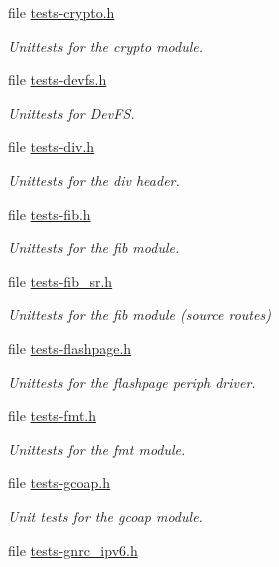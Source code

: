 \begin{DoxyCompactItemize}
file \hyperlink{tests-crypto_8h}{tests-\/crypto.\+h}
\begin{DoxyCompactList}\small\item\em Unittests for the {\ttfamily crypto} module. \end{DoxyCompactList}\item 
file \hyperlink{tests-devfs_8h}{tests-\/devfs.\+h}
\begin{DoxyCompactList}\small\item\em Unittests for Dev\+FS. \end{DoxyCompactList}\item 
file \hyperlink{tests-div_8h}{tests-\/div.\+h}
\begin{DoxyCompactList}\small\item\em Unittests for the {\ttfamily div} header. \end{DoxyCompactList}\item 
file \hyperlink{tests-fib_8h}{tests-\/fib.\+h}
\begin{DoxyCompactList}\small\item\em Unittests for the {\ttfamily fib} module. \end{DoxyCompactList}\item 
file \hyperlink{tests-fib__sr_8h}{tests-\/fib\+\_\+sr.\+h}
\begin{DoxyCompactList}\small\item\em Unittests for the {\ttfamily fib} module (source routes) \end{DoxyCompactList}\item 
file \hyperlink{tests-flashpage_8h}{tests-\/flashpage.\+h}
\begin{DoxyCompactList}\small\item\em Unittests for the {\ttfamily flashpage} periph driver. \end{DoxyCompactList}\item 
file \hyperlink{tests-fmt_8h}{tests-\/fmt.\+h}
\begin{DoxyCompactList}\small\item\em Unittests for the {\ttfamily fmt} module. \end{DoxyCompactList}\item 
file \hyperlink{tests-gcoap_8h}{tests-\/gcoap.\+h}
\begin{DoxyCompactList}\small\item\em Unit tests for the gcoap module. \end{DoxyCompactList}\item 
file \hyperlink{tests-gnrc__ipv6_8h}{tests-\/gnrc\+\_\+ipv6.\+h}

\end{DoxyCompactItemize}
